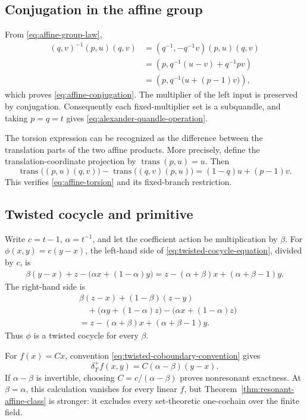 \subsection{Conjugation in the affine group}

From \eqref{eq:affine-group-law},
\begin{align*}
 (q,v)^{-1}(p,u)(q,v)
 &=(q^{-1},-q^{-1}v)(p,u)(q,v)\\
 &=\left(p,q^{-1}(u-v)+q^{-1}pv\right)\\
 &=\left(p,q^{-1}\bigl(u+(p-1)v\bigr)\right),
\end{align*}
which proves \eqref{eq:affine-conjugation}.  The multiplier of the left input is
preserved by conjugation.  Consequently each fixed-multiplier set is a subquandle,
and taking $p=q=t$ gives \eqref{eq:alexander-quandle-operation}.

The torsion expression can be recognized as the difference between the translation
parts of the two affine products.  More precisely, define the translation-coordinate
projection by $\operatorname{trans}(p,u)=u$.  Then
\[
 \operatorname{trans}\bigl((p,u)(q,v)\bigr)
 -\operatorname{trans}\bigl((q,v)(p,u)\bigr)
 =(1-q)u+(p-1)v.
\]
This verifies \eqref{eq:affine-torsion} and its fixed-branch restriction.

\subsection{Twisted cocycle and primitive}

Write $c=t-1$, $\alpha=t^{-1}$, and let the coefficient action be multiplication
by $\beta$.  For $\phi(x,y)=c(y-x)$, the left-hand side of
\eqref{eq:twisted-cocycle-equation}, divided by $c$, is
\begin{align*}
 \beta(y-x)+z-\bigl(\alpha x+(1-\alpha)y\bigr)
 =z-(\alpha+\beta)x+(\alpha+\beta-1)y.
\end{align*}
The right-hand side is
\begin{align*}
 &\beta(z-x)+(1-\beta)(z-y)\\
 &\quad+\bigl(\alpha y+(1-\alpha)z\bigr)
       -\bigl(\alpha x+(1-\alpha)z\bigr)\\
 &=z-(\alpha+\beta)x+(\alpha+\beta-1)y.
\end{align*}
Thus $\phi$ is a twisted cocycle for every $\beta$.

For $f(x)=Cx$, convention \eqref{eq:twisted-coboundary-convention} gives
\[
 \delta_T^+f(x,y)=C(\alpha-\beta)(y-x).
\]
If $\alpha-\beta$ is invertible, choosing $C=c/(\alpha-\beta)$ proves
nonresonant exactness.  At $\beta=\alpha$, this calculation vanishes for every
linear $f$, but Theorem~\ref{thm:resonant-affine-class} is stronger: it excludes
every set-theoretic one-cochain over the finite field.

